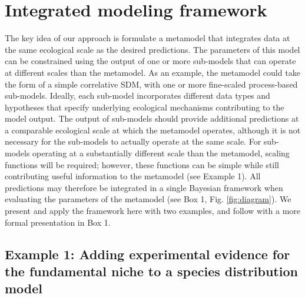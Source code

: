\documentclass[11pt]{article}
\begin{document}
%
%

\section*{Integrated modeling framework}

The key idea of our approach is formulate a metamodel that integrates data at the same ecological scale as the desired predictions.
The parameters of this model can be constrained using the output of one or more sub-models that can operate at different scales than the metamodel.
As an example, the metamodel could take the form of a simple correlative \ac{SDM}, with one or more fine-scaled process-based sub-models.
Ideally, each sub-model incorporates different data types and hypotheses that specify underlying ecological mechanisms contributing to the model output.
The output of sub-models should provide additional predictions at a comparable ecological scale at which the metamodel operates, although it is not necessary for the sub-models to actually operate at the same scale.
For sub-models operating at a substantially different scale than the metamodel, scaling functions will be required; however, these functions can be simple while still contributing useful information to the metamodel (see Example 1). 
All predictions may therefore be integrated in a single Bayesian framework when evaluating the parameters of the metamodel (see Box 1, Fig. \ref{fig:diagram}).
We present and apply the framework here with two examples, and follow with a more formal presentation in Box 1.


%
%
\subsection*{Example 1: Adding experimental evidence for the fundamental niche to a species distribution model}
\end{document}
